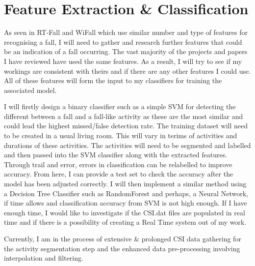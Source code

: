 \section{Feature Extraction \& Classification}
As seen in RT-Fall and WiFall which use similar number and type of features for recognising a fall, I will need to gather and research further features that could be an indication of a fall occurring. The vast majority of the projects and papers I have reviewed have used the same features. As a result, I will try to see if my workings are consistent with theirs and if there are any other features I could use. All of these features will form the input to my classifiers for training the associated model. \par
I will firstly design a binary classifier such as a simple SVM for detecting the different between a fall and a fall-like activity as these are the most similar and could lead the highest missed/false detection rate. The training dataset will need to be created in a usual living room. This will vary in terims of activities and durations of these activities. The activities will need to be segmented and labelled and then passed into the SVM classifier along with the extracted features. Through trail and error, errors in classification can be relabelled to improve accuracy. From here, I can provide a test set to check the accuracy after the model has been adjusted correctly. I will then implement a similar method using a Decision Tree Classifier such as RandomForest and perhaps, a Neural Network, if time allows and classification accuracy from SVM is not high enough. If I have enough time, I would like to investigate if the CSI.dat files are populated in real time and if there is a possibility of creating a Real Time system out of my work. \par
Currently, I am in the process of extensive \& prolonged CSI data gathering for the activity segmentation step and the enhanced data pre-processing involving interpolation and filtering. 